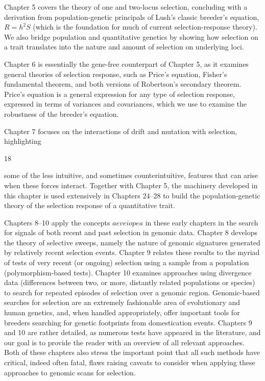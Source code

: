 \documentclass{article}
\begin{document}
Chapter 5 covers the theory of one and two-locus selection, concluding with a derivation from population-genetic principals of Lush's classic breeder's equation,  $ R = h^{2}S $ (which is the foundation for much of current selection-response theory). We also bridge population and quantitative genetics by showing how selection on a trait translates into the nature and amount of selection on underlying loci.

Chapter 6 is essentially the gene-free counterpart of Chapter 5, as it examines general theories of selection response, such as Price's equation, Fisher's fundamental theorem, and both versions of Robertson's secondary theorem. Price's equation is a general expression for any type of selection response, expressed in terms of variances and covariances, which we use to examine the robustness of the breeder's equation.

Chapter 7 focuses on the interactions of drift and mutation with selection, highlighting

18

some of the less intuitive, and sometimes counterintuitive, features that can arise when these forces interact. Together with Chapter 5, the machinery developed in this chapter is used extensively in Chapters 24–28 to build the population-genetic theory of the selection response of a quantitative trait.

Chapters 8–10 apply the concepts  $ aeveiopea $ in these early chapters in the search for signals of both recent and past selection in genomic data. Chapter 8 develops the theory of selective sweeps, namely the nature of genomic signatures generated by relatively recent selection events. Chapter 9 relates these results to the myriad of tests of very recent (or ongoing) selection using a sample from a population (polymorphism-based tests). Chapter 10 examines approaches using divergence data (differences between two, or more, distantly related populations or species) to search for repeated episodes of selection over a genomic region. Genomic-based searches for selection are an extremely fashionable area of evolutionary and human genetics, and, when handled appropriately, offer important tools for breeders searching for genetic footprints from domestication events. Chapters 9 and 10 are rather detailed, as numerous tests have appeared in the literature, and our goal is to provide the reader with an overview of all relevant approaches. Both of these chapters also stress the important point that all such methods have critical, indeed often fatal, flaws raising caveats to consider when applying these approaches to genomic scans for selection.
\end{document}
